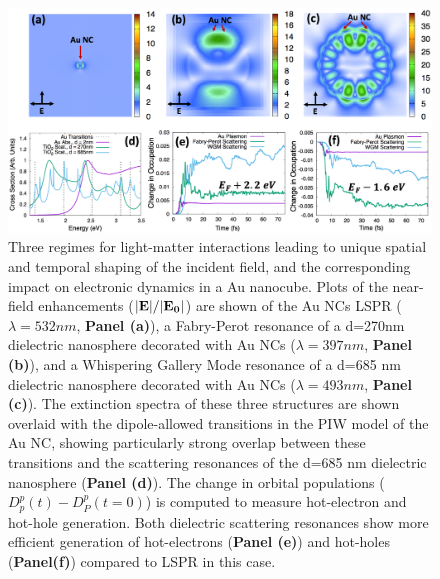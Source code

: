 \documentclass[journal=jpclcd,manuscript=article]{achemso}
\begin{document}
\begin{figure}
\begin{center}
\includegraphics[width=6in]{figs/Au_AllThree_Alternate.png}
\caption{Three regimes for light-matter interactions leading to unique
spatial and temporal shaping of the incident field, and the corresponding
impact on electronic dynamics in a Au nanocube. Plots of the near-field enhancements (${\bf |E|}/{\bf |E_0|}$) are shown of the
Au NCs LSPR ($\lambda=532 nm$, {\bf Panel (a)}), a Fabry-Perot resonance of a d=270nm dielectric nanosphere decorated with Au NCs ($\lambda = 397 nm$, {\bf Panel (b)}),
and a Whispering Gallery Mode resonance of a d=685 nm dielectric nanosphere decorated with Au NCs ($\lambda = 493 nm$, {\bf Panel (c)}).
The extinction spectra of these three structures are shown overlaid with the dipole-allowed transitions in the PIW model of the Au NC, showing particularly
strong overlap between these transitions and the scattering resonances of the d=685 nm dielectric nanosphere ({\bf Panel (d)}).
The change in orbital populations ($D_p^p(t)-D_P^p(t=0)$) is computed to measure hot-electron and hot-hole generation.
Both dielectric scattering resonances show more efficient generation of hot-electrons ({\bf Panel (e)}) and hot-holes ({\bf Panel(f)}) compared to LSPR in this case.}
\end{center}
\end{figure}
\end{document}
